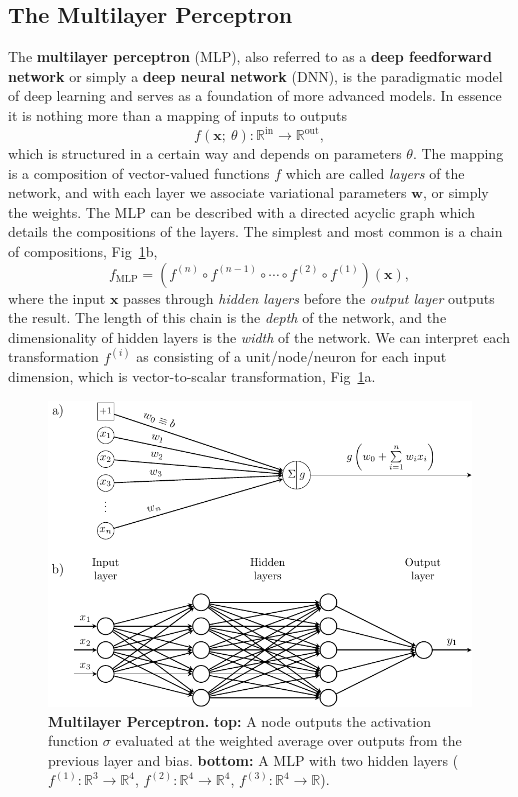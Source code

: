 \subsection{The Multilayer Perceptron} %
The \textbf{multilayer perceptron} (MLP), also referred to as a \textbf{deep feedforward network} or simply a \textbf{deep neural network} (DNN), is the paradigmatic model of deep learning and serves as a foundation of more advanced models. In essence it is nothing more than a mapping of inputs to outputs
\begin{equation}
	f(\mathbf{x}; ~\theta): \mathbb{R}^\text{in} \rightarrow \mathbb{R}^{\text{out}},
\end{equation}
which is structured in a certain way and depends on parameters $\theta$. The mapping is a composition of vector-valued functions $f$ which are called \emph{layers} of the network, and with each layer we associate variational parameters $\mathbf{w}$, or simply the weights. The MLP can be described with a directed acyclic graph which details the compositions of the layers. The simplest and most common is a chain of compositions, Fig~\ref{fig:mlp}b, 
\begin{equation}
f_{\text{MLP}} = \left(f^{(n)} \circ f^{(n-1)} \circ \cdots \circ f^{(2)} \circ f^{(1)} \right)(\mathbf{x}),
\end{equation}
where the input $\textbf{x}$ passes through \emph{hidden layers} before the \emph{output layer} outputs the result. The length of this chain is the \emph{depth} of the network, and the dimensionality of hidden layers is the \emph{width} of the network. We can interpret each transformation $f^{(i)}$ as consisting of a unit/node/neuron for each input dimension, which is vector-to-scalar transformation, Fig~\ref{fig:mlp}a.
\begin{figure}[h]
	\centering
	\includegraphics[width=\linewidth]{Chapter4/Figs/Vector/mlp.pdf}
	\caption[Multilayer Perceptron]{\textbf{Multilayer Perceptron.} \textbf{top: }A node outputs the activation function $\sigma$ evaluated at the weighted average over outputs from the previous layer and bias. \textbf{bottom: } A MLP with two hidden layers ($f^{(1)}: \mathbb{R}^3 \rightarrow \mathbb{R}^4$, $f^{(2)}: \mathbb{R}^4 \rightarrow \mathbb{R}^4$, $f^{(3)}: \mathbb{R}^4 \rightarrow \mathbb{R}$).}
	\label{fig:mlp}
\end{figure} 
